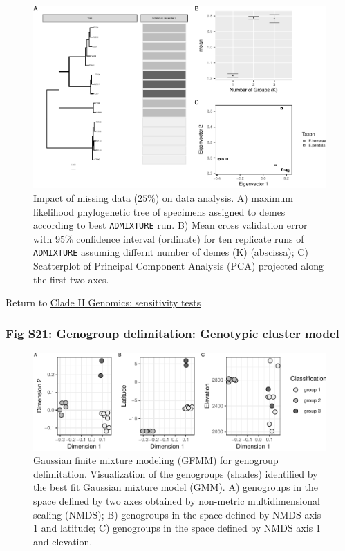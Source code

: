 \documentclass[
  11pt,
]{article}
\begin{document}
\begin{figure}
\includegraphics{Supplementary_Material_files/figure-latex/cladeIIgenomicSensitivityAnalysesSmallestplots-1} \caption{Impact of missing data ($25\%$) on data analysis. A) maximum likelihood phylogenetic tree of specimens assigned to demes according to best \texttt{ADMIXTURE} run. B) Mean cross validation error with $95\%$ confidence interval (ordinate) for ten replicate runs of \texttt{ADMIXTURE} assuming differnt number of demes (K) (abscissa); C) Scatterplot of Principal Component Analysis (PCA) projected along the first two axes.}\label{fig:cladeIIgenomicSensitivityAnalysesSmallestplots}
\end{figure}

Return to \protect\hyperlink{sensitivity-tests-1}{Clade II Genomics: sensitivity tests}
\pagebreak

\hypertarget{fig-s21-genogroup-delimitation-genotypic-cluster-model}{%
\subsubsection{Fig S21: Genogroup delimitation: Genotypic cluster model}\label{fig-s21-genogroup-delimitation-genotypic-cluster-model}}

\begin{figure}
\includegraphics{Supplementary_Material_files/figure-latex/cladeIImolecularDelimitationsNmms-1} \caption{Gaussian finite mixture modeling (GFMM) for genogroup delimitation. Visualization of the genogroups (shades) identified by the best fit Gaussian mixture model (GMM). A) genogroups in the space defined by two axes obtained by non-metric multidimensional scaling (NMDS); B) genogroups in the space defined by NMDS axis 1 and latitude; C) genogroups in the space defined by NMDS axis 1 and elevation.}\label{fig:cladeIImolecularDelimitationsNmms}
\end{figure}
\end{document}
